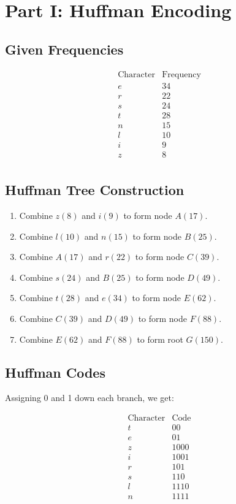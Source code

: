 \documentclass{article}
\begin{document}
\section*{Part I: Huffman Encoding}

\subsection*{Given Frequencies}
\[
\begin{array}{c|c}
\text{Character} & \text{Frequency} \\
\hline
e & 34 \\
r & 22 \\
s & 24 \\
t & 28 \\
n & 15 \\
l & 10 \\
i & 9  \\
z & 8  \\
\end{array}
\]

\subsection*{Huffman Tree Construction}

\begin{enumerate}
  \item Combine $z(8)$ and $i(9)$ to form node $A(17)$.
  \item Combine $l(10)$ and $n(15)$ to form node $B(25)$.
  \item Combine $A(17)$ and $r(22)$ to form node $C(39)$.
  \item Combine $s(24)$ and $B(25)$ to form node $D(49)$.
  \item Combine $t(28)$ and $e(34)$ to form node $E(62)$.
  \item Combine $C(39)$ and $D(49)$ to form node $F(88)$.
  \item Combine $E(62)$ and $F(88)$ to form root $G(150)$.
\end{enumerate}

\subsection*{Huffman Codes}
Assigning 0 and 1 down each branch, we get:

\[
\begin{array}{c|c}
\text{Character} & \text{Code} \\
\hline
t & 00 \\
e & 01 \\
z & 1000 \\
i & 1001 \\
r & 101 \\
s & 110 \\
l & 1110 \\
n & 1111 \\
\end{array}
\]
\end{document}
